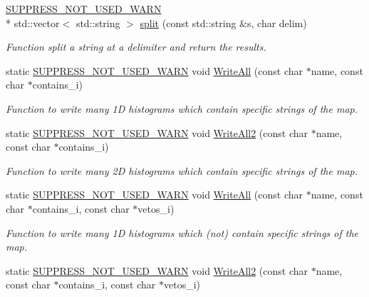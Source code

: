 \begin{DoxyCompactItemize}
\hyperlink{HistClass_8hh_a85edd6ac47f5ea2970c76af20855738c}{S\-U\-P\-P\-R\-E\-S\-S\-\_\-\-N\-O\-T\-\_\-\-U\-S\-E\-D\-\_\-\-W\-A\-R\-N} \\*
std\-::vector$<$ std\-::string $>$ \hyperlink{namespaceHistClass_a6ebdd346a3c6631aee671db3f377b668}{split} (const std\-::string \&s, char delim)
\begin{DoxyCompactList}\small\item\em Function split a string at a delimiter and return the results. \end{DoxyCompactList}\item 
static \hyperlink{HistClass_8hh_a85edd6ac47f5ea2970c76af20855738c}{S\-U\-P\-P\-R\-E\-S\-S\-\_\-\-N\-O\-T\-\_\-\-U\-S\-E\-D\-\_\-\-W\-A\-R\-N} void \hyperlink{namespaceHistClass_a23e09b3d56b8aa284e228a8a85fb37ec}{Write\-All} (const char $\ast$name, const char $\ast$contains\-\_\-i)
\begin{DoxyCompactList}\small\item\em Function to write many 1\-D histograms which contain specific strings of the map. \end{DoxyCompactList}\item 
static \hyperlink{HistClass_8hh_a85edd6ac47f5ea2970c76af20855738c}{S\-U\-P\-P\-R\-E\-S\-S\-\_\-\-N\-O\-T\-\_\-\-U\-S\-E\-D\-\_\-\-W\-A\-R\-N} void \hyperlink{namespaceHistClass_a4b81fc3ad235d6627f447a7dfb871947}{Write\-All2} (const char $\ast$name, const char $\ast$contains\-\_\-i)
\begin{DoxyCompactList}\small\item\em Function to write many 2\-D histograms which contain specific strings of the map. \end{DoxyCompactList}\item 
static \hyperlink{HistClass_8hh_a85edd6ac47f5ea2970c76af20855738c}{S\-U\-P\-P\-R\-E\-S\-S\-\_\-\-N\-O\-T\-\_\-\-U\-S\-E\-D\-\_\-\-W\-A\-R\-N} void \hyperlink{namespaceHistClass_a01b819e4439174c88bdaa557804f7eb2}{Write\-All} (const char $\ast$name, const char $\ast$contains\-\_\-i, const char $\ast$vetos\-\_\-i)
\begin{DoxyCompactList}\small\item\em Function to write many 1\-D histograms which (not) contain specific strings of the map. \end{DoxyCompactList}\item 
static \hyperlink{HistClass_8hh_a85edd6ac47f5ea2970c76af20855738c}{S\-U\-P\-P\-R\-E\-S\-S\-\_\-\-N\-O\-T\-\_\-\-U\-S\-E\-D\-\_\-\-W\-A\-R\-N} void \hyperlink{namespaceHistClass_ae1f262197503e7a93e7f007aa5205144}{Write\-All2} (const char $\ast$name, const char $\ast$contains\-\_\-i, const char $\ast$vetos\-\_\-i)

\end{DoxyCompactItemize}
